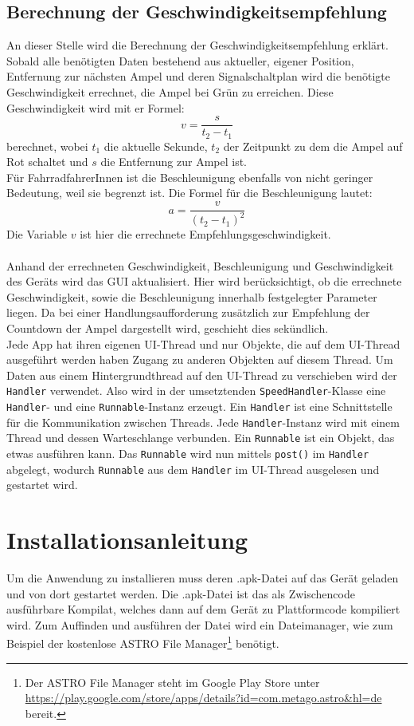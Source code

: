 \subsection{Berechnung der Geschwindigkeitsempfehlung}
An dieser Stelle wird die Berechnung der Geschwindigkeitsempfehlung erklärt. Sobald alle benötigten Daten bestehend aus aktueller, eigener Position, Entfernung zur nächsten Ampel und deren Signalschaltplan wird die benötigte Geschwindigkeit errechnet, die Ampel bei Grün zu erreichen. Diese Geschwindigkeit wird mit er Formel: 
\[ v = \frac{s}{t_{2} - t_{1}} \]
berechnet, wobei $t_1$ die aktuelle Sekunde, $t_2$ der Zeitpunkt zu dem die Ampel auf Rot schaltet und $s$ die Entfernung zur Ampel ist. \\
Für FahrradfahrerInnen ist die Beschleunigung ebenfalls von nicht geringer Bedeutung, weil sie begrenzt ist. Die Formel für die Beschleunigung lautet:
\[ a = \frac{v}{(t_{2} - t_{1})^{2}} \] 
Die Variable $v$ ist hier die errechnete Empfehlungsgeschwindigkeit.\\\\
Anhand der errechneten Geschwindigkeit, Beschleunigung und Geschwindigkeit des Geräts wird das \gls{GUI} aktualisiert. Hier wird berücksichtigt, ob die errechnete Geschwindigkeit, sowie die Beschleunigung innerhalb festgelegter Parameter liegen. Da bei einer Handlungsaufforderung zusätzlich zur Empfehlung der Countdown der Ampel dargestellt wird, geschieht dies sekündlich.\\
Jede \gls{App} hat ihren eigenen \gls{UI}-Thread und nur Objekte, die auf dem \gls{UI}-Thread ausgeführt werden haben Zugang zu anderen Objekten auf diesem Thread. Um Daten aus einem Hintergrundthread auf den \gls{UI}-Thread zu verschieben wird der \texttt{Handler} verwendet.
Also wird in der umsetztenden \texttt{SpeedHandler}-Klasse eine \texttt{Handler}- und eine \texttt{Runnable}-Instanz erzeugt. Ein \texttt{Handler} ist eine Schnittstelle für die Kommunikation zwischen Threads. Jede \texttt{Handler}-Instanz wird mit einem Thread und dessen Warteschlange verbunden. Ein \texttt{Runnable} ist ein Objekt, das etwas ausführen kann. Das \texttt{Runnable} wird nun mittels \texttt{post()} im \texttt{Handler} abgelegt, wodurch \texttt{Runnable} aus dem \texttt{Handler} im \gls{UI}-Thread ausgelesen und gestartet wird. 
%
%
\section{Installationsanleitung}
Um die Anwendung zu installieren muss deren .apk-Datei auf das Gerät geladen und von dort gestartet werden. Die .apk-Datei ist das als Zwischencode ausführbare Kompilat, welches dann auf dem Gerät zu Plattformcode kompiliert wird. Zum Auffinden und ausführen der Datei wird ein Dateimanager, wie zum Beispiel der kostenlose ASTRO File Manager\footnote{ Der ASTRO File Manager steht im Google Play Store unter \url{https://play.google.com/store/apps/details?id=com.metago.astro&hl=de} bereit.}  benötigt. 
